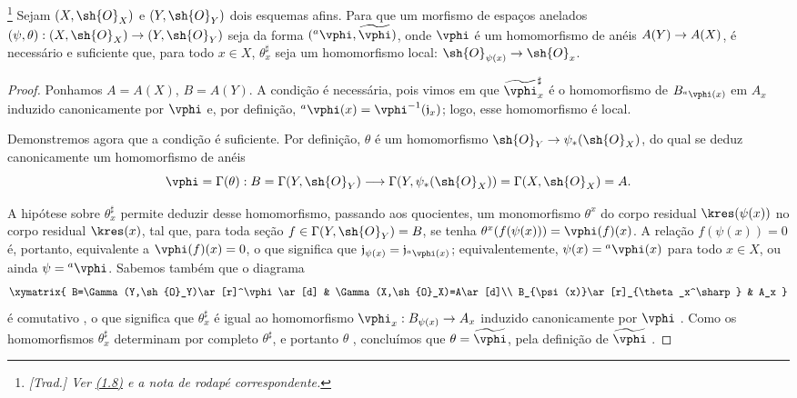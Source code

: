 \documentclass[oneside]{amsart}
\makeatletter
\newcommand{\ega@arrow}[2]{\mathchoice{#1}{#2}{#2}{#2}}
\renewcommand{\to}{\ega@arrow{\longrightarrow}{\rightarrow}}
\newcommand{\oldpage}[2][]{{\marginnote{\normalfont\textbf{#1}~|~#2}}\ignorespaces}
\let\EGAOriginalLabel\label
\renewcommand{\label}[1]{\phantomsection\EGAOriginalLabel{#1}}
\makeatother
\begin{document}
\begin{theorem}[1.7.3]
\label{I.1.7.3}
\footnote{\emph{[Trad.] Ver \hyperref[subsection:I.1.8]{(1.8)} e a nota de
rodapé correspondente.}}
Sejam $(X,\sh{O}_X)$ e $(Y,\sh{O}_Y)$ dois esquemas afins.
Para que um morfismo de espaços anelados
$(\psi,\theta):(X,\sh{O}_X)\to(Y,\sh{O}_Y)$ seja da forma
$({}^a\vphi,\widetilde{\vphi})$, onde $\vphi$ é um homomorfismo de anéis
$A(Y)\to A(X)$, é necessário e suficiente que, para todo $x\in X$,
$\theta_x^\sharp$ seja um homomorfismo local:
$\sh{O}_{\psi(x)}\to\sh{O}_x$.
\end{theorem}

\begin{proof}
\oldpage[I]{97}
Ponhamos $A=A(X)$, $B=A(Y)$.
A condição é necessária, pois vimos em  que
$\widetilde{\vphi}_x^\sharp$ é o homomorfismo de
$B_{{}^a\vphi(x)}$ em $A_x$ induzido canonicamente por $\vphi$ e, por
definição, ${}^a\vphi(x)=\vphi^{-1}(\mathfrak{j}_x)$; logo, esse
homomorfismo é local.

Demonstremos agora que a condição é suficiente.
Por definição, $\theta$ é um homomorfismo
$\sh{O}_Y\to\psi_*(\sh{O}_X)$, do qual se deduz canonicamente um
homomorfismo de anéis
\[
  \vphi=\Gamma(\theta):B=\Gamma(Y,\sh{O}_Y)
  \to\Gamma(Y,\psi_*(\sh{O}_X))=\Gamma(X,\sh{O}_X)=A.
\]

A hipótese sobre $\theta_x^\sharp$ permite deduzir desse homomorfismo,
passando aos quocientes, um monomorfismo $\theta^x$ do corpo residual
$\kres(\psi(x))$ no corpo residual $\kres(x)$, tal que, para toda seção
$f\in\Gamma(Y,\sh{O}_Y)=B$, se tenha
$\theta^x(f(\psi(x)))=\vphi(f)(x)$.
A relação $f(\psi(x))=0$ é, portanto, equivalente a
$\vphi(f)(x)=0$, o que significa que
$\mathfrak{j}_{\psi(x)}=\mathfrak{j}_{{}^a\vphi(x)}$; equivalentemente,
$\psi(x)={}^a\vphi(x)$ para todo $x\in X$, ou ainda
$\psi={}^a\vphi$.
Sabemos também que o diagrama
\[
  \xymatrix{
    B=\Gamma(Y,\sh{O}_Y)\ar[r]^\vphi\ar[d] &
    \Gamma(X,\sh{O}_X)=A\ar[d]\\
    B_{\psi(x)}\ar[r]_{\theta_x^\sharp} &
    A_x
  }
\]
é comutativo , o que significa que
$\theta_x^\sharp$ é igual ao homomorfismo
$\vphi_x:B_{\psi(x)}\to A_x$ induzido canonicamente por $\vphi$
.
Como os homomorfismos $\theta_x^\sharp$ determinam por completo
$\theta^\sharp$, e portanto $\theta$ , concluímos que
$\theta=\widetilde{\vphi}$, pela definição de $\widetilde{\vphi}$
.
\end{proof}
\end{document}
